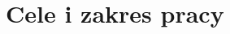 \documentclass[11pt,a4paper,polish,thesis]{dcsbook}
\begin{document}


\section{Cele i zakres pracy}


\end{document}
